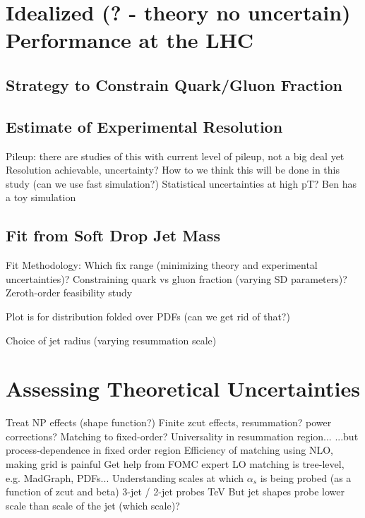 \documentclass[11pt,letterpaper]{article}
\begin{document}
\section{Idealized (? - theory no uncertain) Performance at the LHC}

\subsection{Strategy to Constrain Quark/Gluon Fraction}

\subsection{Estimate of Experimental Resolution}

	Pileup:  there are studies of this with current level of pileup, not a big deal yet
	Resolution achievable, uncertainty?
	How to we think this will be done in this study (can we use fast simulation?)
	Statistical uncertainties at high pT?
	Ben has a toy simulation

\subsection{Fit from Soft Drop Jet Mass}

Fit Methodology:
	Which fix range (minimizing theory and experimental uncertainties)?
	Constraining quark vs gluon fraction (varying SD parameters)?
	Zeroth-order feasibility study
	
	Plot is for distribution folded over PDFs (can we get rid of that?)

	Choice of jet radius (varying resummation scale)








\section{Assessing Theoretical Uncertainties}

	Treat NP effects (shape function?)
	Finite zcut effects, resummation?  power corrections?
	Matching to fixed-order?
		Universality in resummation region...
		...but process-dependence in fixed order region
		Efficiency of matching using NLO, making grid is painful
		Get help from FOMC expert
		LO matching is tree-level, e.g. MadGraph, PDFs...
	Understanding scales at which $\alpha_s$ is being probed (as a function of zcut and beta)
		3-jet / 2-jet probes TeV
		But jet shapes probe lower scale than scale of the jet (which scale)?
\end{document}

